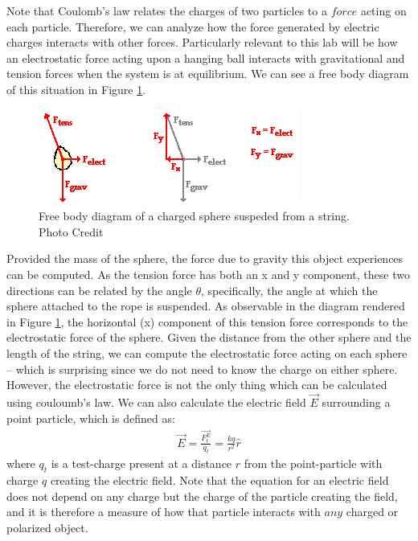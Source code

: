 \documentclass[oneside,12pt]{amsart}
\begin{document}
	\indent Note that Coulomb's law relates the charges of two particles to a $force$ acting on each particle. Therefore, we can analyze how the force generated by electric charges interacts with other forces. Particularly relevant to this lab will be how an electrostatic force acting upon a hanging ball interacts with gravitational and tension forces when the system is at equilibrium. We can see a free body diagram of this situation in Figure \ref{frbdy}.\\
	\begin{figure}[h]
		\includegraphics[width=\medgraph,scale=0.01]{frbdy.png}
		\caption{Free body diagram of a charged sphere suspeded from a string. Photo Credit \cite{physcls} 
		}
		\label{frbdy}
	\end{figure}

	\indent Provided the mass of the sphere, the force due to gravity this object experiences can be computed. As the tension force has both an x and y component, these two directions can be related by the angle $\theta$, specifically, the angle at which the sphere attached to the rope is suspended. As observable in the diagram rendered in Figure \ref{frbdy}, the horizontal (x) component of this tension force corresponds to the electrostatic force of the sphere. Given the distance from the other sphere and the length of the string, we can compute the electrostatic force acting on each sphere -- which is surprising since we do not need to know the charge on either sphere.\\
	
	\indent However, the electrostatic force is not the only thing which can be calculated using couloumb's law. We can also calculate the electric field $\vec{E}$ surrounding a point particle, which is defined as\cite{electricfield}:
	\begin{align}
	\vec{E} = \frac{\vec{F^E_t}}{q_t} = \frac{kq}{r^2}\hat{r}
	\end{align} 
	where $q_t$ is a test-charge present at a distance $r$ from the point-particle with charge $q$ creating the electric field. Note that the equation for an electric field does not depend on any charge but the charge of the particle creating the field, and it is therefore a measure of how that particle interacts with $any$ charged or polarized object.
	
\end{document}
